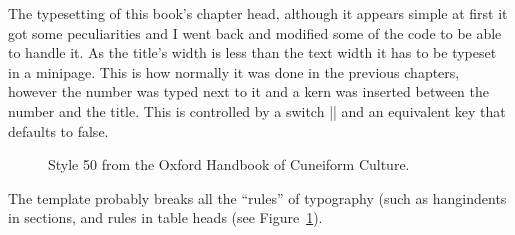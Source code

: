 The typesetting of this book’s chapter head, although it appears simple at first it got some peculiarities and I went
back and modified some of the code to be able to handle it. As the title’s width is less than the text width it has to be typeset in a minipage. This is how normally it was done in the previous chapters, however the number was typed next to it and a kern was inserted between the number and the title. This is controlled by a switch |\@runinhead| and an equivalent key that defaults to false. 
\begin{figure}[ht]
\caption{Style 50 from the Oxford Handbook of Cuneiform Culture.}
\label{fig:style50}
\end{figure} 
The template probably breaks all the ``rules'' of typography (such as hangindents in sections, and rules in
table heads (see Figure~\ref{fig:style50}).

